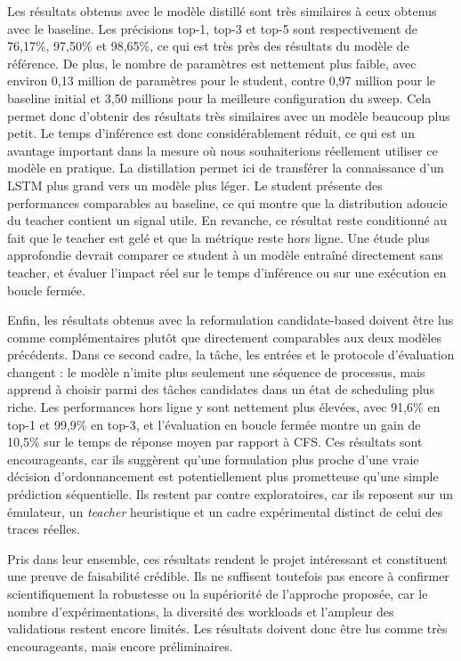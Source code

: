 \documentclass[letterpaper, 10 pt, conference]{ieeeconf}  %
\begin{document}
Les résultats obtenus avec le modèle distillé sont très similaires à ceux obtenus avec le baseline. Les précisions top-1, top-3 et top-5 sont respectivement de 76,17\%, 97,50\% et 98,65\%, ce qui est très près des résultats du modèle de référence. De plus, le nombre de paramètres est nettement plus faible, avec environ 0,13 million de paramètres pour le student, contre 0,97 million pour le baseline initial et 3,50 millions pour la meilleure configuration du sweep. Cela permet donc d'obtenir des résultats très similaires avec un modèle beaucoup plus petit. Le temps d'inférence est donc considérablement réduit, ce qui est un avantage important dans la mesure où nous souhaiterions réellement utiliser ce modèle en pratique.
La distillation permet ici de transférer la connaissance d’un LSTM plus grand vers un modèle plus léger. Le student présente des performances comparables au baseline, ce qui montre que la distribution adoucie du teacher contient un signal utile. En revanche, ce résultat reste conditionné au fait que le teacher est gelé et que la métrique reste hors ligne. Une étude plus approfondie devrait comparer ce student à un modèle entraîné directement sans teacher, et évaluer l’impact réel sur le temps d’inférence ou sur une exécution en boucle fermée.

Enfin, les résultats obtenus avec la reformulation candidate-based doivent être lus comme complémentaires plutôt que directement comparables aux deux modèles précédents. Dans ce second cadre, la tâche, les entrées et le protocole d'évaluation changent : le modèle n'imite plus seulement une séquence de processus, mais apprend à choisir parmi des tâches candidates dans un état de scheduling plus riche. Les performances hors ligne y sont nettement plus élevées, avec 91,6\% en top-1 et 99,9\% en top-3, et l'évaluation en boucle fermée montre un gain de 10,5\% sur le temps de réponse moyen par rapport à CFS. Ces résultats sont encourageants, car ils suggèrent qu'une formulation plus proche d'une vraie décision d'ordonnancement est potentiellement plus prometteuse qu'une simple prédiction séquentielle. Ils restent par contre exploratoires, car ils reposent sur un émulateur, un \textit{teacher} heuristique et un cadre expérimental distinct de celui des traces réelles.

Pris dans leur ensemble, ces résultats rendent le projet intéressant et constituent une preuve de faisabilité crédible. Ils ne suffisent toutefois pas encore à confirmer scientifiquement la robustesse ou la supériorité de l'approche proposée, car le nombre d'expérimentations, la diversité des workloads et l'ampleur des validations restent encore limités. Les résultats doivent donc être lus comme très encourageants, mais encore préliminaires.
\end{document}
